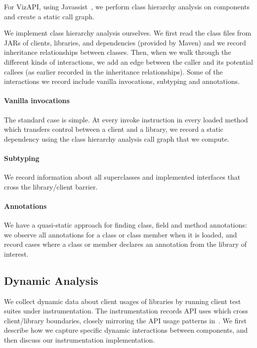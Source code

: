 For VizAPI, using Javassist~\cite{chiba00:_load_struc_reflec_java}, we 
perform class hierarchy analysis on components and create a static call
graph. 

We implement class hierarchy analysis ourselves. We first read the class files from JARs of clients, libraries, and dependencies (provided by Maven) and we record
inheritance relationships between classes. Then, when we walk through the different kinds of interactions,
 we add an edge between the caller and its potential callees
(as earlier recorded in the inheritance relationships). 
Some of the interactions we record include vanilla invocations, subtyping and annotations.

\paragraph{Vanilla invocations}
The standard case is simple. At every invoke instruction in every
loaded method which transfers control between a client and a
library, we record a static dependency using the class hierarchy
analysis call graph that we compute.

\paragraph{Subtyping}
We record information about all superclasses and implemented interfaces that cross the library/client barrier. 

\paragraph{Annotations}
We have a quasi-static approach for finding class, field and method annotations:
we observe all annotations for a class or class member when it is loaded, and
record cases where a class or member declares an annotation from the library of interest.

\subsection{Dynamic Analysis}
\label{subsec:dynamic}
We collect dynamic data about client usages of libraries by running client
test suites under instrumentation. The instrumentation records API
uses which cross client/library boundaries, closely mirroring the API
usage patterns
in~\cite{venkatanarayanan22:_study_lever_api_usage_patter}. We first
describe how we capture specific dynamic interactions between components, and
then discuss our instrumentation implementation.


